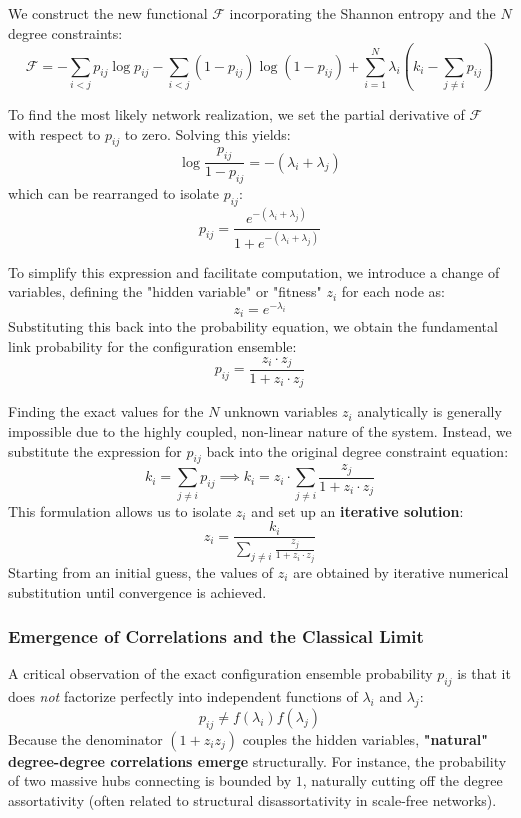 We construct the new functional \(\mathcal{F}\) incorporating the Shannon entropy and the \(N\) degree constraints:
\[
    \mathcal{F} = - \sum_{i<j} p_{ij} \log p_{ij} - \sum_{i<j} (1 - p_{ij}) \log(1 - p_{ij}) + \sum_{i=1}^N \lambda_i \left( k_i - \sum_{j \neq i} p_{ij} \right)
\]

To find the most likely network realization, we set the partial derivative of \(\mathcal{F}\) with respect to \(p_{ij}\) to zero. Solving this yields:
\[
    \log \frac{p_{ij}}{1 - p_{ij}} = -(\lambda_i + \lambda_j)
\]
which can be rearranged to isolate \(p_{ij}\):
\[
    p_{ij} = \frac{e^{-(\lambda_i + \lambda_j)}}{1 + e^{-(\lambda_i + \lambda_j)}}
\]

To simplify this expression and facilitate computation, we introduce a change of variables, defining the "hidden variable" or "fitness" \(z_i\) for each node as:
\[
    z_i = e^{-\lambda_i}
\]
Substituting this back into the probability equation, we obtain the fundamental link probability for the configuration ensemble:
\[
    p_{ij} = \frac{z_i \cdot z_j}{1 + z_i \cdot z_j}
\]

Finding the exact values for the \(N\) unknown variables \(z_i\) analytically is generally impossible due to the highly coupled, non-linear nature of the system. Instead, we substitute the expression for \(p_{ij}\) back into the original degree constraint equation:
\[
    k_i = \sum_{j \neq i} p_{ij} \implies k_i = z_i \cdot \sum_{j \neq i} \frac{z_j}{1 + z_i \cdot z_j}
\]
This formulation allows us to isolate \(z_i\) and set up an \textbf{iterative solution}:
\[
    z_i = \frac{k_i}{\sum_{j \neq i} \frac{z_j}{1 + z_i \cdot z_j}}
\]
Starting from an initial guess, the values of \(z_i\) are obtained by iterative numerical substitution until convergence is achieved.

\subsubsection{Emergence of Correlations and the Classical Limit}
\label{subsubsec:correlations_classical_limit}

A critical observation of the exact configuration ensemble probability \(p_{ij}\) is that it does \textit{not} factorize perfectly into independent functions of \(\lambda_i\) and \(\lambda_j\):
\[
    p_{ij} \neq f(\lambda_i)f(\lambda_j)
\]
Because the denominator \((1 + z_i z_j)\) couples the hidden variables, \textbf{"natural" degree-degree correlations emerge} structurally. For instance, the probability of two massive hubs connecting is bounded by \(1\), naturally cutting off the degree assortativity (often related to structural disassortativity in scale-free networks).

